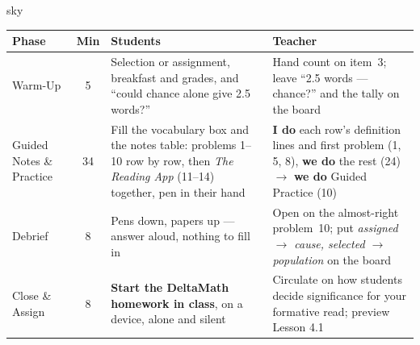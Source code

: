 \documentclass[10pt]{article}
\begin{document}
\boxguard[30]
\begin{skillbox}{sky}
\renewcommand{\arraystretch}{1.25}
\begin{tabularx}{\linewidth}{@{}l c X X@{}}
\textbf{Phase} & \textbf{Min} & \textbf{Students} & \textbf{Teacher} \\
\hline
Warm-Up & 5 & Selection or assignment, breakfast and grades, and ``could chance alone give
2.5 words?'' & Hand count on item~3; leave ``2.5 words --- chance?'' and the tally on the
board \\
Guided Notes \& Practice & 34 & Fill the vocabulary box and the notes table: problems 1--10 row
by row, then \emph{The Reading App} (11--14) together, pen in their hand & \textbf{I do}
each row's definition lines and first problem (1, 5, 8), \textbf{we do} the rest (24)
$\to$ \textbf{we do} Guided Practice (10) \\
Debrief & 8 & Pens down, papers up --- answer aloud, nothing to fill in & Open on the
almost-right problem~10; put \emph{assigned $\to$ cause, selected $\to$ population} on the
board \\
Close \& Assign & 8 & \textbf{Start the DeltaMath homework in class}, on a device, alone and
silent & Circulate on how students decide significance for your formative read; preview Lesson 4.1 \\
\end{tabularx}
\end{skillbox}
\end{document}
